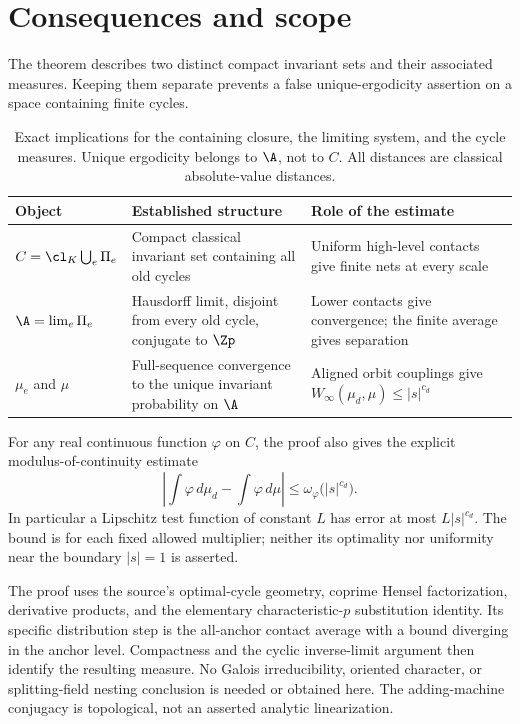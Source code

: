 \section{Consequences and scope}
\label{sec:scope}

The theorem describes two distinct compact invariant sets and their
associated measures. Keeping them separate prevents a false
unique-ergodicity assertion on a space containing finite cycles.

\begin{table}[ht]
\centering
\small
\begin{tabular}{@{}>{\raggedright\arraybackslash}p{}
 >{\raggedright\arraybackslash}p{}
 >{\raggedright\arraybackslash}p{}@{}}
\toprule
Object & Established structure & Role of the estimate \\
\midrule
$C=\cl_K\bigcup_e\Pi_e$
& Compact classical invariant set containing all old cycles
& Uniform high-level contacts give finite nets at every scale \\
\addlinespace
$\A=\lim_e\Pi_e$
& Hausdorff limit, disjoint from every old cycle, conjugate to $\Zp$
& Lower contacts give convergence; the finite average gives separation \\
\addlinespace
$\mu_e$ and $\mu$
& Full-sequence convergence to the unique invariant probability on $\A$
& Aligned orbit couplings give $W_\infty(\mu_d,\mu)\le|s|^{c_d}$ \\
\bottomrule
\end{tabular}
\caption{Exact implications for the containing closure, the limiting
system, and the cycle measures. Unique ergodicity belongs to $\A$,
not to $C$. All distances are classical absolute-value distances.}
\label{tab:objects}
\end{table}

For any real continuous function $\varphi$ on $C$, the proof also
gives the explicit modulus-of-continuity estimate
\[
 \left|\int\varphi\,d\mu_d-\int\varphi\,d\mu\right|
 \le \omega_\varphi\bigl(|s|^{c_d}\bigr).
\]
In particular a Lipschitz test function of constant $L$ has error
at most $L|s|^{c_d}$. The bound is for each fixed allowed multiplier;
neither its optimality nor uniformity near the boundary $|s|=1$ is
asserted.

The proof uses the source's optimal-cycle geometry, coprime Hensel
factorization, derivative products, and the elementary
characteristic-$p$ substitution identity. Its specific distribution
step is the all-anchor contact average with a bound diverging in
the anchor level. Compactness and the cyclic inverse-limit argument
then identify the resulting measure. No Galois irreducibility,
oriented character, or splitting-field nesting conclusion is needed
or obtained here. The adding-machine conjugacy is topological, not
an asserted analytic linearization.

